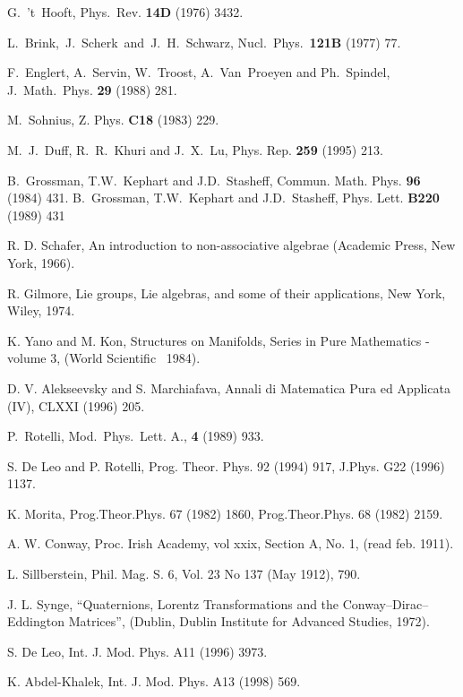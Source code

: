 \documentclass[a4paper,12pt]{book}
\begin{document}
\begin{thebibliography}{999}
  G.~'t~Hooft, Phys.~Rev. \textbf{14D} (1976) 3432.

  L.~Brink,~J.~Scherk~and~J.~H.~Schwarz, Nucl.~Phys.~\textbf{121B%
} (1977) 77.

  F.~Englert, A.~Servin, W.~Troost, A.~Van~Proeyen and
Ph.~Spindel, J.~Math.~Phys. \textbf{29} (1988) 281.

  M.~Sohnius, Z. Phys. \textbf{C18} (1983) 229.

  M.~J.~Duff, R.~R.~Khuri and J.~X.~Lu, Phys. Rep. \textbf{%
259} (1995) 213.

  B.~Grossman, T.W.~Kephart and J.D.~Stasheff, Commun. Math.
Phys. \textbf{96} (1984) 431.\newline
B.~Grossman, T.W.~Kephart and J.D.~Stasheff, Phys. Lett. \textbf{B220}
(1989) 431

  R. D. Schafer, An introduction to non-associative
algebrae (Academic Press, New York, 1966).

  R. Gilmore, Lie groups, Lie algebras, and some of their
applications, New York, Wiley, 1974.

  K. Yano and M. Kon, Structures on Manifolds, Series in Pure
Mathematics - volume 3, (World Scientific \ 1984).

  D. V. Alekseevsky and S. Marchiafava, Annali di Matematica
Pura ed Applicata (IV), CLXXI (1996) 205.

  P.~Rotelli, Mod.~Phys.~Lett. A., \textbf{4} (1989) 933.

  S. De Leo and P. Rotelli, Prog. Theor. Phys. 92 (1994)
917, J.Phys. G22 (1996) 1137.

  K. Morita, Prog.Theor.Phys. 67 (1982) 1860,
Prog.Theor.Phys. 68 (1982) 2159.

  A. W. Conway, Proc. Irish Academy, vol xxix, Section A,
No. 1, (read feb. 1911).

  L. Sillberstein, Phil. Mag. S. 6, Vol. 23 No 137 (May
1912), 790.

  J. L. Synge, ``Quaternions, Lorentz Transformations and the
Conway--Dirac--Eddington Matrices'', (Dublin, Dublin Institute for Advanced
Studies, 1972).

  S. De Leo, Int. J. Mod. Phys. A11 (1996) 3973.

  K. Abdel-Khalek, Int. J. Mod. Phys. A13 (1998) 569.


\end{thebibliography}
\end{document}
